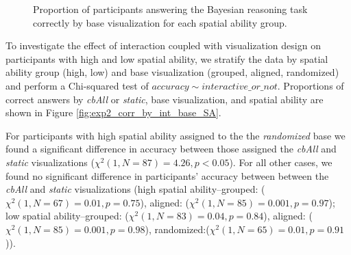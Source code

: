 \begin{figure}[h]
    \centering
    \caption{Proportion of participants answering the Bayesian reasoning task correctly by base visualization for each spatial ability group.}
    \label{fig:exp2_bases_by_sa}
\end{figure}

To investigate the effect of interaction coupled with visualization design on participants with high and low spatial ability, we stratify the data by spatial ability group (high, low) and base visualization (grouped, aligned, randomized) and perform a Chi-squared test of $accuracy \sim interactive\_or\_not$.
Proportions of correct answers by \textit{cbAll} or \textit{static}, base visualization, and spatial ability are shown in Figure \ref{fig:exp2_corr_by_int_base_SA}. 

For participants with high spatial ability assigned to the the \textit{randomized} base we found a significant difference in accuracy between those assigned the \textit{cbAll} and \textit{static} visualizations ($\chi^2(1, N = 87) = 4.26, p < 0.05$). For all other cases, we found no significant difference in participants' accuracy between between the \textit{cbAll} and \textit{static} visualizations (high spatial ability--grouped: ($\chi^2(1, N = 67) = 0.01, p = 0.75$), aligned: ($\chi^2(1, N = 85) = 0.001, p = 0.97$); low spatial ability--grouped: ($\chi^2(1, N = 83) = 0.04, p = 0.84$), aligned: ($\chi^2(1, N = 85) = 0.001, p = 0.98$), randomized:($\chi^2(1, N = 65) = 0.01, p = 0.91$)). 


